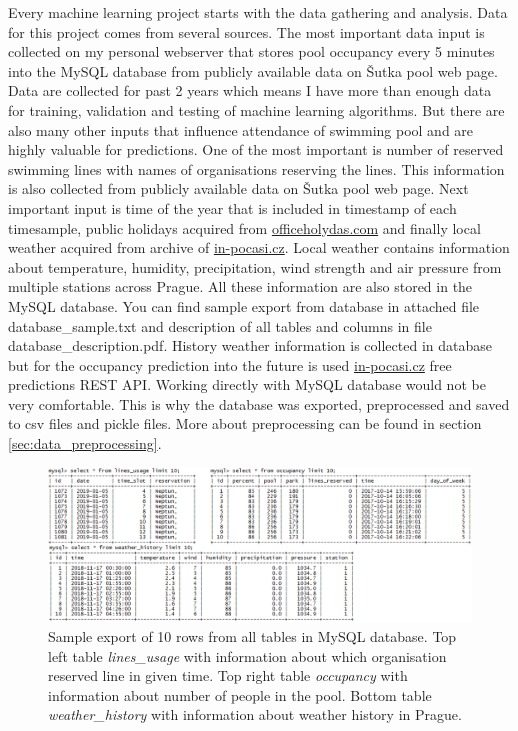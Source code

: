 \documentclass{article}
\begin{document}
Every machine learning project starts with the data gathering and analysis. Data for this project comes from several sources. The most important data input is collected on my personal webserver that stores pool occupancy every 5 minutes into the MySQL database from publicly available data on \v{S}utka pool web page. Data are collected for past 2 years which means I have more than enough data for training, validation and testing of machine learning algorithms. But there are also many other inputs that influence attendance of swimming pool and are highly valuable for predictions. One of the most important is number of reserved swimming lines with names of organisations reserving the lines. This information is also collected from publicly available data on \v{S}utka pool web page. Next important input is time of the year that is included in timestamp of each timesample, public holidays acquired from \href{https://www.officeholidays.com/countries/czech-republic}{officeholydas.com} and finally local weather acquired from archive of \href{https://www.in-pocasi.cz/archiv/}{in-pocasi.cz}. Local weather contains information about temperature, humidity, precipitation, wind strength and air pressure from multiple stations across Prague. All these information are also stored in the MySQL database. You can find sample export from database in attached file database\_sample.txt and description of all tables and columns in file database\_description.pdf. History weather information is collected in database but for the occupancy prediction into the future is  used \href{http://www.in-pocasi.cz/pocasi-na-web/}{in-pocasi.cz} free predictions REST API. Working directly with MySQL database would not be very comfortable. This is why the database was exported, preprocessed and saved to csv files and pickle files. More about preprocessing can be found in section \ref{sec:data_preprocessing}. 

\begin{figure}[h!]
\centering
\includegraphics[width=12cm]{imgs/db_export.png}
\caption{Sample export of 10 rows from all tables in MySQL database. Top left table \emph{lines\_usage} with information about which organisation reserved line in given time. Top right table \emph{occupancy} with information about number of people in the pool. Bottom table \emph{weather\_history} with information about weather history in Prague.}
\label{fig:db_export}
\end{figure}
\end{document}
